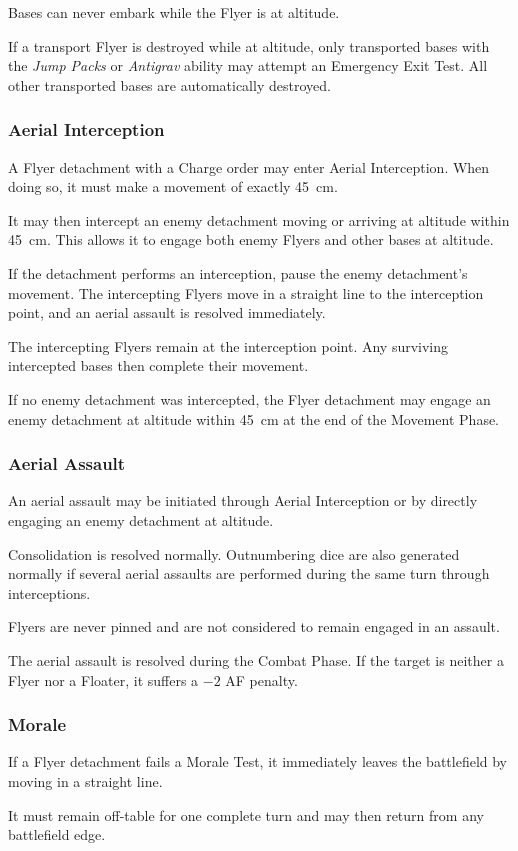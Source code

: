 Bases can never embark while the Flyer is at altitude.

If a transport Flyer is destroyed while at altitude, only transported bases with the \textit{Jump Packs} or \textit{Antigrav} ability may attempt an Emergency Exit Test. All other transported bases are automatically destroyed.

\subsubsection{Aerial Interception}

A Flyer detachment with a Charge order may enter Aerial Interception. When doing so, it must make a movement of exactly 45~cm.

It may then intercept an enemy detachment moving or arriving at altitude within 45~cm. This allows it to engage both enemy Flyers and other bases at altitude.

If the detachment performs an interception, pause the enemy detachment's movement. The intercepting Flyers move in a straight line to the interception point, and an aerial assault is resolved immediately.

The intercepting Flyers remain at the interception point. Any surviving intercepted bases then complete their movement.

If no enemy detachment was intercepted, the Flyer detachment may engage an enemy detachment at altitude within 45~cm at the end of the Movement Phase.

\subsubsection{Aerial Assault}

An aerial assault may be initiated through Aerial Interception or by directly engaging an enemy detachment at altitude.

Consolidation is resolved normally. Outnumbering dice are also generated normally if several aerial assaults are performed during the same turn through interceptions.

Flyers are never pinned and are not considered to remain engaged in an assault.

The aerial assault is resolved during the Combat Phase. If the target is neither a Flyer nor a Floater, it suffers a $-2$ AF penalty.

\subsubsection{Morale}

If a Flyer detachment fails a Morale Test, it immediately leaves the battlefield by moving in a straight line.

It must remain off-table for one complete turn and may then return from any battlefield edge.

